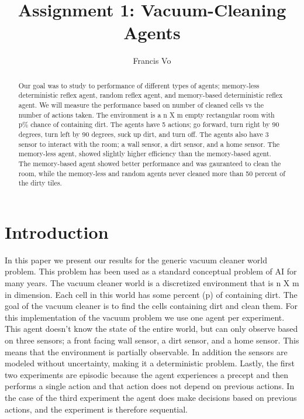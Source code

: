 \documentclass[a4paper,10pt]{article}
\title{Assignment 1: Vacuum-Cleaning Agents}
\author{Francis Vo}
\begin{document}
\maketitle
\begin{abstract}
Our goal was to study to performance of different types of agents; memory-less deterministic reflex agent, random reflex agent, and memory-based deterministic reflex agent.
We will measure the performance based on number of cleaned cells vs the number of actions taken.
The environment is a n X m empty rectangular room with p\% chance of containing dirt.
The agents have 5 actions; go forward, turn right by 90 degrees, turn left by 90 degrees, suck up dirt, and turn off.
The agents also have 3 sensor to interact with the room; a wall sensor, a dirt sensor, and a home sensor.
The memory-less agent, showed slightly higher efficiency than the memory-based agent.
The memory-based agent showed better performance and was gauranteed to clean the room, while the memory-less and random agents never cleaned more than 50 percent of the dirty tiles.
\end{abstract}

\section{Introduction}

In this paper we present our results for the generic vacuum cleaner world problem.
This problem has been used as a standard conceptual problem of AI for many years.
The vacuum cleaner world is a discretized environment that is n X m in dimension.
Each cell in this world has some percent (p) of containing dirt.
The goal of the vacuum cleaner is to find the cells containing dirt and clean them.
For this implementation of the vacuum problem we use one agent per experiment.
This agent doesn't know the state of the entire world, but can only observe based on three sensors; a front facing wall sensor, a dirt sensor, and a home sensor.
This means that the environment is partially observable.
In addition the sensors are modeled without uncertainty, making it a deterministic problem.
Lastly, the first two experiments are episodic because the agent experiences a precept and then performs a single action and that action does not depend on previous actions.
In the case of the third experiment the agent does make decisions based on previous actions, and the experiment is therefore sequential.

\end{document}
